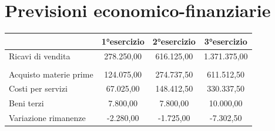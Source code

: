 \documentclass[12pt, a4paper]{article}
\begin{document}
\section{Previsioni economico-finanziarie}
\begin{tabular}{|lccc|}
    \hline
    \rowcolor[HTML]{CBCEFB}
    \multicolumn{1}{|l|}{\cellcolor[HTML]{CBCEFB}}                                                                                   & \multicolumn{1}{c|}{\cellcolor[HTML]{CBCEFB}\textbf{1°esercizio}} & \multicolumn{1}{c|}{\cellcolor[HTML]{CBCEFB}\textbf{2°esercizio}} & \textbf{3°esercizio} \\ \hline
    \multicolumn{1}{|l|}{Ricavi di vendita}                                                                                          & \multicolumn{1}{c|}{278.250,00}                                   & \multicolumn{1}{c|}{616.125,00}                                   & 1.371.375,00         \\ \hline
    \multicolumn{4}{|l|}{}                                                                                                                                                                                                                                                                          \\ \hline
    \multicolumn{1}{|l|}{Acquisto materie prime}                                                                                     & \multicolumn{1}{c|}{124.075,00}                                   & \multicolumn{1}{c|}{274.737,50}                                   & 611.512,50           \\ \hline
    \multicolumn{1}{|l|}{Costi per servizi}                                                                                          & \multicolumn{1}{c|}{67.025,00}                                    & \multicolumn{1}{c|}{148.412,50}                                   & 330.337,50           \\ \hline
    \multicolumn{1}{|l|}{Beni terzi}                                                                                                 & \multicolumn{1}{c|}{7.800,00}                                     & \multicolumn{1}{c|}{7.800,00}                                     & 10.000,00             \\ \hline
    \multicolumn{1}{|l|}{Variazione rimanenze}                                                                                       & \multicolumn{1}{c|}{-2.280,00}                                    & \multicolumn{1}{c|}{-1.725,00}                                    & -7.302,50            \\ \hline

\end{tabular}
\end{document}
